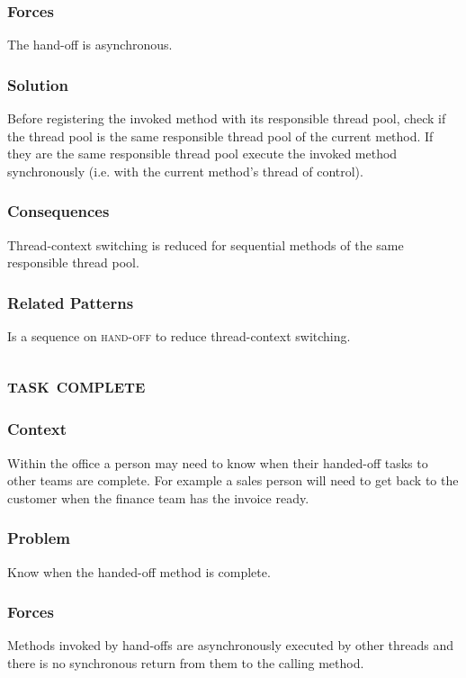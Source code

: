 \documentclass[prodmode]{style/acmlarge}
\begin{document}
\subsubsection*{Forces} The hand-off is asynchronous.

\subsubsection*{Solution} Before registering the invoked method with its
responsible thread pool, check if the thread pool is the same responsible thread
pool of the current method.  If they are the same responsible thread pool
execute the invoked method synchronously (i.e. with the current method's thread
of control).

\subsubsection*{Consequences} Thread-context switching is reduced for sequential
methods of the same responsible thread pool.

\subsubsection*{Related Patterns} Is a sequence on \textsc{hand-off} to reduce
thread-context switching.



\subsection{\textsc{\textbf{task complete}}}

\subsubsection*{Context} Within the office a person may need to know when their
handed-off tasks to other teams are complete.  For example a sales person will
need to get back to the customer when the finance team has the invoice ready.

\subsubsection*{Problem} Know when the handed-off method is complete.

\subsubsection*{Forces} Methods invoked by hand-offs are asynchronously executed by other
threads and there is no synchronous return from them to the calling method.
\end{document}
